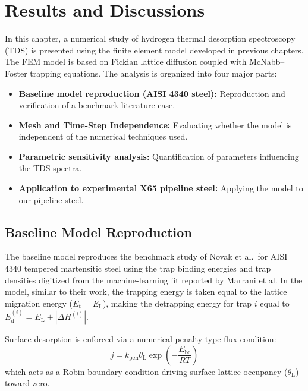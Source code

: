 \documentclass[a4paper,12pt,oneside]{report}
\begin{document}
\chapter{Results and Discussions}

In this chapter, a numerical study of hydrogen thermal desorption spectroscopy (TDS) is presented using the finite element model developed in previous chapters. The FEM model is based on Fickian lattice diffusion coupled with McNabb--Foster trapping equations. The analysis is organized into four major parts:

\begin{itemize}
    \item \textbf{Baseline model reproduction (AISI 4340 steel):} Reproduction and verification of a benchmark literature case.
    \item \textbf{Mesh and Time-Step Independence:} Evaluating whether the model is independent of the numerical techniques used.
    \item \textbf{Parametric sensitivity analysis:} Quantification of parameters influencing the TDS spectra.
    \item \textbf{Application to experimental X65 pipeline steel:} Applying the model to our pipeline steel.
\end{itemize}

\section{Baseline Model Reproduction}

The baseline model reproduces the benchmark study of Novak et al.\cite{Novak2010}\ for AISI 4340 tempered martensitic steel using the trap binding energies and trap densities digitized from the machine-learning fit reported by Marrani et al.\cite{Marrani2025} In the model, similar to their work, the trapping energy is taken equal to the lattice migration energy ($E_{\mathrm{t}} = E_{\mathrm{L}}$), making the detrapping energy for trap $i$ equal to $E_{\mathrm{d}}^{(i)} = E_{\mathrm{L}} + |\Delta H^{(i)}|$.

Surface desorption is enforced via a numerical penalty-type flux condition:
\begin{equation}
j = k_{\mathrm{pen}} \theta_{\mathrm{L}} \exp\left(-\frac{E_{\mathrm{bc}}}{RT}\right)
\end{equation}
which acts as a Robin boundary condition driving surface lattice occupancy ($\theta_{\mathrm{L}}$) toward zero. 
\end{document}
